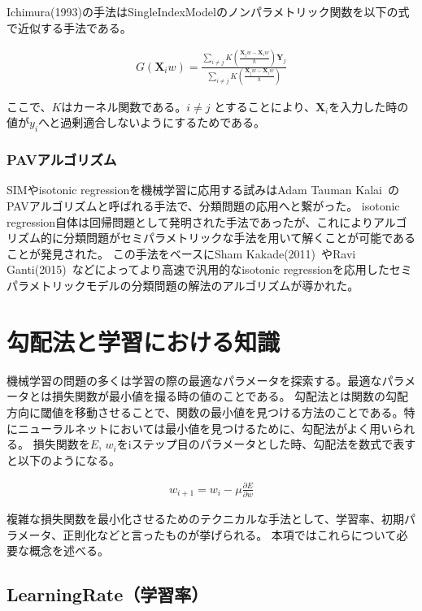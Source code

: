 Ichimura(1993)の手法はSingleIndexModelのノンパラメトリック関数を以下の式で近似する手法である。


\begin{eqnarray}
G(\mathbf{X}_iw)=\frac{\sum_{i\neq j} K\left(\frac{\mathbf{X}_j w - \mathbf{X}_i w}{h}\right)\mathbf{Y}_j}{\sum_{i\neq j} K\left(\frac{\mathbf{X}_j w - \mathbf{X}_i w}{h}\right)}
\label{eq:ichimura}
\end{eqnarray}

ここで、$ K $はカーネル関数である。$ i \neq j $ とすることにより、$ \mathbf{X}_i $を入力した時の値が$ y_i $へと過剰適合しないようにするためである。



\subsubsection{PAVアルゴリズム}

SIMやisotonic regressionを機械学習に応用する試みはAdam Tauman Kalai~\cite{isotron}のPAVアルゴリズムと呼ばれる手法で、分類問題の応用へと繋がった。
isotonic regression自体は回帰問題として発明された手法であったが、これによりアルゴリズム的に分類問題がセミパラメトリックな手法を用いて解くことが可能であることが発見された。
この手法をベースにSham Kakade(2011)~\cite{efficient_sim}やRavi Ganti(2015)~\cite{lsim}などによってより高速で汎用的なisotonic regressionを応用したセミパラメトリックモデルの分類問題の解法のアルゴリズムが導かれた。


\section{勾配法と学習における知識}
機械学習の問題の多くは学習の際の最適なパラメータを探索する。最適なパラメータとは損失関数が最小値を撮る時の値のことである。
勾配法とは関数の勾配方向に閾値を移動させることで、関数の最小値を見つける方法のことである。特にニューラルネットにおいては最小値を見つけるために、勾配法がよく用いられる。
損失関数を$ E $, $ w_i $をiステップ目のパラメータとした時、勾配法を数式で表すと以下のようになる。

\begin{eqnarray}
w_{i + 1} = w_i - \mu \frac{\partial E}{\partial w}
\label{eq:learning_rate}
\end{eqnarray}

複雑な損失関数を最小化させるためのテクニカルな手法として、学習率、初期パラメータ、正則化などと言ったものが挙げられる。
本項ではこれらについて必要な概念を述べる。
\subsection{LearningRate（学習率）}

